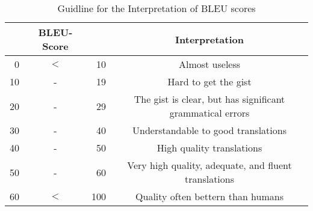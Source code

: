 \begin{table}
	\caption{Guidline for the Interpretation of BLEU scores}
	\label{tab:help_bleu}
	\centering
\begin{tabular}{rcr|c}
&  BLEU-Score& & Interpretation \\
	\hline
 0& $<$ & 10& Almost useless \\
10&  -  & 19& Hard to get the gist \\
20&  -  & 29& The gist is clear, but has significant grammatical errors \\
30&  -  & 40& Understandable to good translations \\
40&  -  & 50& High quality translations \\
50&  -  & 60& Very high quality, adequate, and fluent translations \\
60& $<$ &100&Quality often bettern than humans\\
\end{tabular}
\end{table}
